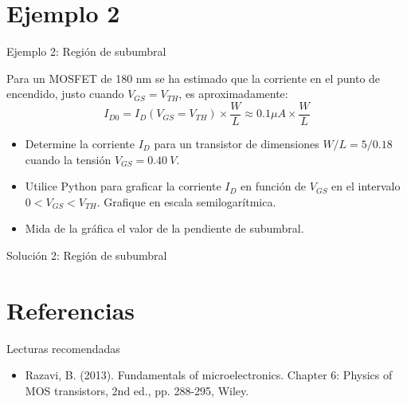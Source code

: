 \documentclass[t,aspectratio=169]{beamer}
\begin{document}
\section{Ejemplo 2}
\begin{frame}{Ejemplo 2: Región de subumbral}

Para un MOSFET de 180 nm se ha estimado que la corriente en el punto de encendido, justo cuando $V_{GS} = V_{TH}$, es aproximadamente:
\[ I_{D0} = I_D (V_{GS}=V_{TH}) \times \dfrac{W}{L} \approx 0.1 \mu{}A \times \dfrac{W}{L} \]

\begin{itemize}
    \item Determine la corriente $I_D$ para un transistor de dimensiones $W/L=5/0.18$ cuando la tensión $V_{GS}=0.40\ V$.
    \item Utilice Python para graficar la corriente $I_D$ en función de $V_{GS}$ en el intervalo $0 < V_{GS} < V_{TH}$. Grafique en escala semilogarítmica.
    \item Mida de la gráfica el valor de la pendiente de subumbral.
\end{itemize}
    
\end{frame}


\begin{frame}{Solución 2: Región de subumbral}

   
\end{frame}


\section{Referencias}
\begin{frame}{Lecturas recomendadas}

\begin{itemize}
    \item Razavi, B. (2013). Fundamentals of microelectronics. Chapter 6: Physics of MOS transistors, 2nd ed., pp. 288-295, Wiley.
\end{itemize}

\end{frame}
\end{document}

